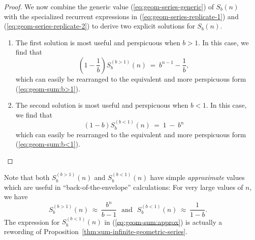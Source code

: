 \begin{proof}
We now combine the generic value (\ref{eq:geom-series-generic}) of
$S_b(n)$ with the specialized recurrent expressions in
(\ref{eq:geom-series-replicate-1}) and
(\ref{eq:geom-series-replicate-2}) to derive two explicit solutions
for $S_b(n)$.
\begin{enumerate}
\item
The first solution is most useful and perspicuous when $b>1$.  In this
case, we find that
\[ \left( 1 - \frac{1}{b} \right)  S^{(b>1)}_{b}(n) \ = \ b^{n-1} -
\frac{1}{b}, \]
which can easily be rearranged to the equivalent and more
perspicuous form (\ref{eq:geom-sum:b>1}).

\item
The second solution is most useful and perspicuous when $b < 1$.  In this
case, we find that
\[ (1-b) S^{(b<1)}_{b}(n) \ = \ 1 \ - \ b^n \]
which can easily be rearranged to the equivalent and more
perspicuous form (\ref{eq:geom-sum:b<1}).
\end{enumerate}
\end{proof}

Note that both $S^{(b>1)}_{b}(n)$ and $S^{(b<1)}_{b}(n)$ have simple
{\em approximate} values which are useful in ``back-of-the-envelope''
calculations: For very large values of $n$, we have
\begin{equation}
\label{eq:geom-sum:approx}
S^{(b>1)}_{b}(n) \ \approx \ \frac{b^n}{b-1} \ \ \
\mbox{and} \ \ \
S^{(b<1)}_{b}(n) \ \approx \ \frac{1}{1-b} .
\end{equation}
The expression for $S^{(b<1)}_{b}(n)$ in (\ref{eq:geom-sum:approx}) is
actually a rewording of
Proposition~\ref{thm:sum-infinite-geometric-series}.

\medskip

